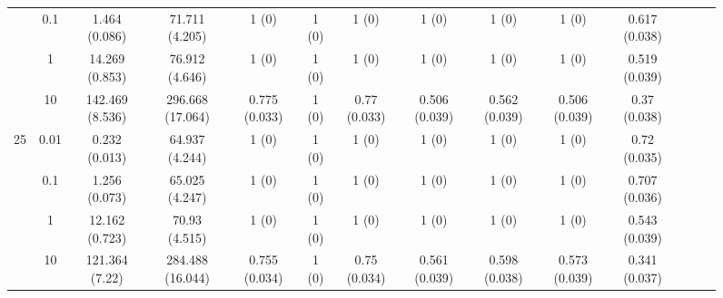 \documentclass[11pt]{article}
\theoremstyle{definition}
\begin{document}
\begin{sidewaysfigure}
\begin{tabular}{cc|cc|ccc|ccc|ccc|c}
    & 0.1 & 1.464 (0.086) & 71.711 (4.205) & 1 (0) & 1 (0) & 1 (0) & 1 (0) & 1 (0) & 1 (0) & 0.617 (0.038) \\ 
   & 1 & 14.269 (0.853) & 76.912 (4.646) & 1 (0) & 1 (0) & 1 (0) & 1 (0) & 1 (0) & 1 (0) & 0.519 (0.039) \\ 
   & 10 & 142.469 (8.536) & 296.668 (17.064) & 0.775 (0.033) & 1 (0) & 0.77 (0.033) & 0.506 (0.039) & 0.562 (0.039) & 0.506 (0.039) & 0.37 (0.038) \\[.3cm]  
 \multirow{4}{*}{25} & 0.01 & 0.232 (0.013) & 64.937 (4.244) & 1 (0) & 1 (0) & 1 (0) & 1 (0) & 1 (0) & 1 (0) & 0.72 (0.035) \\ 
& 0.1 & 1.256 (0.073) & 65.025 (4.247) & 1 (0) & 1 (0) & 1 (0) & 1 (0) & 1 (0) & 1 (0) & 0.707 (0.036) \\ 
 & 1 & 12.162 (0.723) & 70.93 (4.515) & 1 (0) & 1 (0) & 1 (0) & 1 (0) & 1 (0) & 1 (0) & 0.543 (0.039) \\ 
 & 10 & 121.364 (7.22) & 284.488 (16.044) & 0.755 (0.034) & 1 (0) & 0.75 (0.034) & 0.561 (0.039) & 0.598 (0.038) & 0.573 (0.039) & 0.341 (0.037) \\ 
\end{tabular}
\end{sidewaysfigure}
\end{document}
